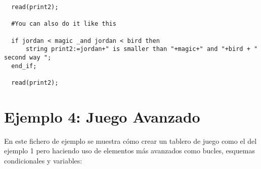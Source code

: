 \documentclass[a4paper,12pt,twoside,openright]{report}
\begin{document}
{\begin{lstlisting}
  read(print2);

  #You can also do it like this

  if jordan < magic _and jordan < bird then
	  string print2:=jordan+" is smaller than "+magic+" and "+bird + " second way ";
  end_if;

  read(print2);

  \end{lstlisting}

  \section{Ejemplo 4: Juego Avanzado}
  
  En este fichero de ejemplo se muestra cómo crear un tablero de juego como el del ejemplo 1 pero haciendo uso 
  de elementos más avanzados como bucles, esquemas condicionales y variables:
  
}
\end{document}
